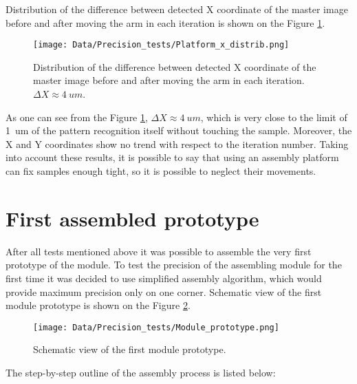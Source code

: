 Distribution of the difference between detected X coordinate of the master image before and after moving the arm in each iteration is shown on the Figure \ref{fig:platform_distribution}.

\begin{figure}[ht]\centering
\texttt{[image: Data/Precision\_tests/Platform\_x\_distrib.png]}
\caption{Distribution of the difference between detected X coordinate of the master image before and after moving the arm in each iteration. $\Delta X \approx 4~um$. }
\label{fig:platform_distribution}
\end{figure}

As one can see from the Figure \ref{fig:platform_distribution}, $\Delta X \approx 4~um$, which is very close to the limit of 1~um of the pattern recognition itself without touching the sample. Moreover, the X and Y coordinates show no trend with respect to the iteration number. Taking into account these results, it is possible to say that using an assembly platform can fix samples enough tight, so it is possible to neglect their movements.

\section{First assembled prototype}

After all tests mentioned above it was possible to assemble the very first prototype of the module. To test the precision of the assembling module for the first time it was decided to use simplified assembly algorithm, which would provide maximum precision only on one corner. Schematic view of the first module prototype is shown on the Figure \ref{fig:module_prototype}.

\begin{figure}[ht]\centering
\texttt{[image: Data/Precision\_tests/Module\_prototype.png]}
\caption{Schematic view of the first module prototype.}
\label{fig:module_prototype}
\end{figure}

The step-by-step outline of the assembly process is listed below:

